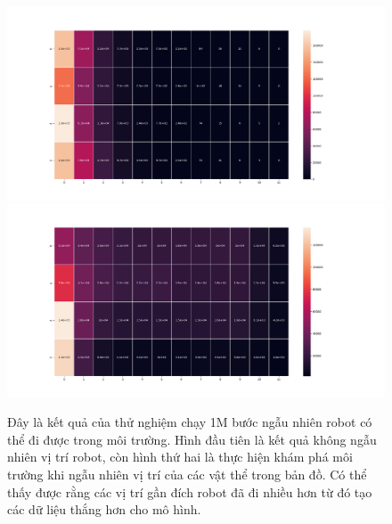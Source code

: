\begin{figure}[ht]
    \centering
    \includegraphics[width=1.2\linewidth]{Pic/First_model/agent_pos_before.png}
    \includegraphics[width=1.2\linewidth]{Pic/First_model/agent_pos_after.png}
    \caption[Bản đồ nhiệt các vị trí robot thường xuất hiện]{Đây là kết quả của thử nghiệm chạy 1M bước ngẫu nhiên robot có thể đi được trong môi trường. Hình đầu tiên là kết quả không ngẫu nhiên vị trí robot, còn hình thứ hai là thực hiện khám phá môi trường khi ngẫu nhiên vị trí của các vật thể trong bản đồ. Có thể thấy được rằng các vị trí gần đích robot đã đi nhiều hơn từ đó tạo các dữ liệu thắng
    hơn cho mô hình.}
    \label{fig:agent_pos}
\end{figure}
\clearpage
